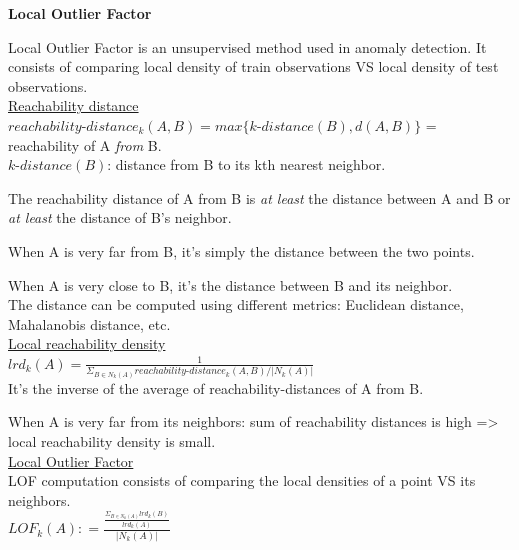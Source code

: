 {\fontsize{12pt}{22pt} \textbf{Local Outlier Factor}\par}

\vspace{5mm}

Local Outlier Factor is an unsupervised method used in anomaly detection. It consists of comparing local density of train observations VS local density of test observations. \\

\underline{Reachability distance} \\

$reachability \mbox{-} distance_k(A,B) = max \{ k \mbox{-} distance (B), d(A,B)\}$  = reachability of A \textit{from} B. \\

$k \mbox{-} distance (B)$: distance from B to its kth nearest neighbor.

The reachability distance of A from B is \textit{at least} the distance between A and B or \textit{at least} the distance of B's neighbor.

When A is very far from B, it's simply the distance between the two points.

When A is very close to B, it's the distance between B and its neighbor. \\

The distance can be computed using different metrics: Euclidean distance, Mahalanobis distance, etc. \\

\underline{Local reachability density} \\

$lrd_k (A) = \frac{1}{\Sigma_{B \in N_k(A)} reachability \mbox{-} distance_k(A,B) / |N_k(A)|}$ \\

It's the inverse of the average of reachability-distances of A from B.

When A is very far from its neighbors: sum of reachability distances is high => local reachability density is small. \\

\underline{Local Outlier Factor} \\

LOF computation consists of comparing the local densities of a point VS its neighbors. \\

$LOF_k(A) : =  \frac{\frac{\Sigma_{B \in N_k(A)}lrd_k(B)}{lrd_k(A)}}{|N_k(A)|}$ \\

